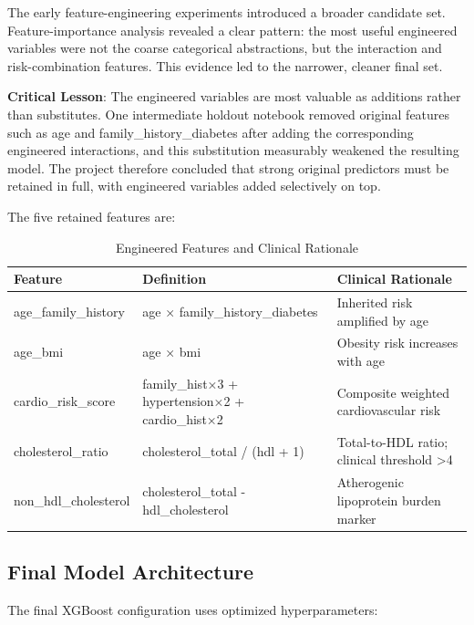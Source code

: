 \documentclass[a4paper,11pt]{article}
\begin{document}
The early feature-engineering experiments introduced a broader candidate set. Feature-importance analysis revealed a clear pattern: the most useful engineered variables were not the coarse categorical abstractions, but the interaction and risk-combination features. This evidence led to the narrower, cleaner final set.

\textbf{Critical Lesson}: The engineered variables are most valuable as additions rather than substitutes. One intermediate holdout notebook removed original features such as age and family\_history\_diabetes after adding the corresponding engineered interactions, and this substitution measurably weakened the resulting model. The project therefore concluded that strong original predictors must be retained in full, with engineered variables added selectively on top.

The five retained features are:

\begin{table}[H]
\centering
\caption{Engineered Features and Clinical Rationale}
\label{tab:features}
\begin{tabular}{lll}
\toprule
\textbf{Feature} & \textbf{Definition} & \textbf{Clinical Rationale} \\
\midrule
age\_family\_history & age × family\_history\_diabetes & Inherited risk amplified by age \\
age\_bmi & age × bmi & Obesity risk increases with age \\
cardio\_risk\_score & family\_hist×3 + hypertension×2 + cardio\_hist×2 & Composite weighted cardiovascular risk \\
cholesterol\_ratio & cholesterol\_total / (hdl + 1) & Total-to-HDL ratio; clinical threshold >4 \\
non\_hdl\_cholesterol & cholesterol\_total - hdl\_cholesterol & Atherogenic lipoprotein burden marker \\
\bottomrule
\end{tabular}
\end{table}

\subsection{Final Model Architecture}

The final XGBoost configuration uses optimized hyperparameters:
\end{document}
